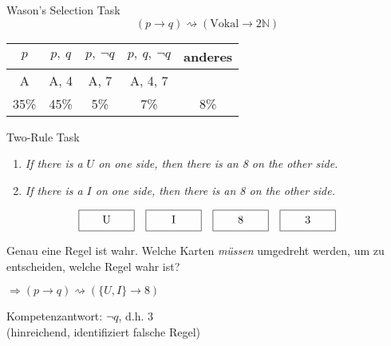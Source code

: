 \begin{frame}{Wason's Selection Task {\scriptsize \cite[S.~44-46]{stenningHumanReasoningCognitive2008}}}
    $$(p \to q) \rightsquigarrow (\text{Vokal} \to 2\mathbb{N})$$

    \begin{center}
        \begin{tabular}{c | c | c | c | c}
            $p$ &$p,~q$ &\alert{$p, ~\lnot q$} &$p, ~q, ~\lnot q$ &anderes \\
            \hline
            A &A, 4 &\alert{A, 7} &A, 4, 7 & \\
            \hline \hline
            35\% &45\% &\alert{5\%} &7\% &8\%
        \end{tabular}
    \end{center}
\end{frame}


\begin{frame}{Two-Rule Task {\scriptsize \cite[S.~61-63]{stenningHumanReasoningCognitive2008}}}
    \begin{enumerate}
        \item \emph{If there is a $U$ on one side, then there is an 8 on the other side.}
        \item \emph{If there is a $I$ on one side, then there is an 8 on the other side.}
    \end{enumerate}

    \[
        \framebox[5em][c]{U\strut}\quad
        \framebox[5em][c]{I\strut}\quad
        \framebox[5em][c]{8\strut}\quad
        \framebox[5em][c]{3\strut}
    \]

    Genau eine Regel ist wahr. Welche Karten \emph{müssen} umgedreht werden, um zu entscheiden, welche Regel wahr ist?

    $\Rightarrow (p \to q) \rightsquigarrow (\{U, I\} \to 8)$

    Kompetenzantwort: $\lnot q$, d.h. $3$\\
    {\footnotesize (hinreichend, identifiziert falsche Regel)}
\end{frame}
